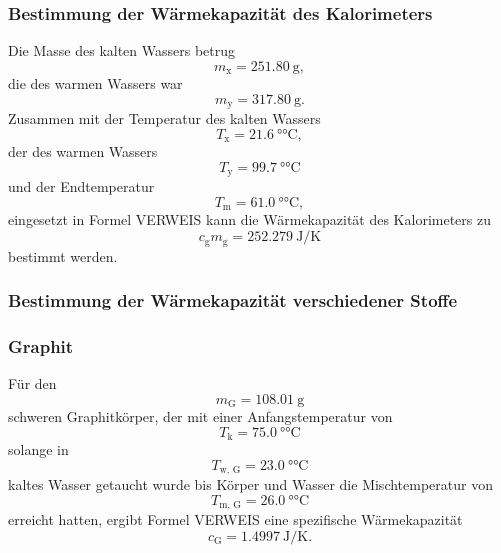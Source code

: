 \subsubsection{Bestimmung der Wärmekapazität des Kalorimeters}
	Die Masse des kalten Wassers betrug
	\begin{equation}
		m_\text{x} = \SI{251.80}{\gram},
	\end{equation}
	die des warmen Wassers war
	\begin{equation}
		m_\text{y} = \SI{317.80}{\g}.
	\end{equation}
	Zusammen mit der Temperatur des kalten Wassers
	\begin{equation}
		T_\text{x} = \SI{21.6}{\degree\celsius},
	\end{equation}
	der des warmen Wassers
	\begin{equation}
		T_\text{y} = \SI{99.7}{\degree\celsius}
	\end{equation}
	und der Endtemperatur
	\begin{equation}
		T_\text{m} = \SI{61.0}{\degree\celsius},
	\end{equation}
	eingesetzt in Formel VERWEIS kann die Wärmekapazität des Kalorimeters zu
	\begin{equation}
		c_\text{g}m_\text{g} = \SI{252.279}{\joule\per\kelvin}
	\end{equation}
	bestimmt werden.


\subsubsection{Bestimmung der Wärmekapazität verschiedener Stoffe}
\subsubsection*{Graphit}
	Für den
	\begin{equation}
		m_\text{G} = \SI{108.01}{\gram}
	\end{equation}
	schweren Graphitkörper, der mit einer Anfangstemperatur von
	\begin{equation}
		T_\text{k} = \SI{75.0}{\degree\celsius}
	\end{equation}
	solange in
	\begin{equation}
		T_\text{w, G} = \SI{23.0}{\degree\celsius}
	\end{equation}
	kaltes Wasser getaucht wurde bis Körper und Wasser die Mischtemperatur von
	\begin{equation}
		T_\text{m, G} = \SI{26.0}{\degree\celsius}
	\end{equation}
	erreicht hatten, ergibt Formel VERWEIS eine spezifische Wärmekapazität
	\begin{equation}
		c_\text{G} = \SI{1.4997}{\joule\per\kelvin}.
	\end{equation}
